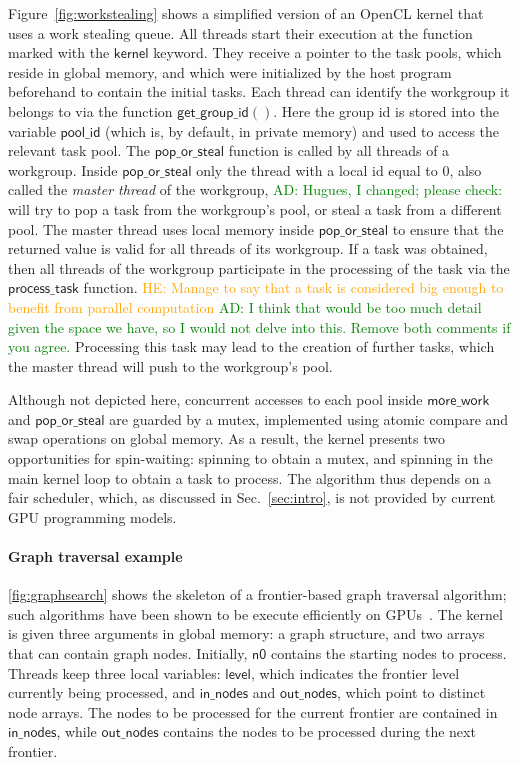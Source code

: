 \documentclass[numbers,nocopyrightspace,10pt]{sigplanconf}
\newcommand{\ADComment}[1]{\textcolor{green}{AD: #1}}
\newcommand{\HEComment}[1]{\textcolor{orange}{HE: #1}}
\newcommand{\myfiglong}{Figure~}
\newcommand{\mysec}{Sec.~}
\newcommand{\getgroupid}{\mathsf{get\_group\_id}}
\newcommand{\keyword}[1]{\mathsf{#1}}
\begin{document}
\myfiglong\ref{fig:workstealing} shows a simplified version of an OpenCL
kernel that uses a work stealing queue. All threads start their execution at the
function marked with the $\mathsf{kernel}$ keyword. They receive a
pointer to the task pools, which reside in global memory, and which
were initialized by the host program beforehand to contain the initial
tasks. Each thread can identify the workgroup it belongs to via the
function $\getgroupid()$.  Here the group id is stored into the
variable $\mathsf{pool\_id}$ (which is, by default, in private memory)
and used to access the relevant task pool. The
$\mathsf{pop\_or\_steal}$ function is called by all threads of a
workgroup.  Inside $\mathsf{pop\_or\_steal}$ only the thread with a local id equal to
$0$, also called the \emph{master thread} of the workgroup,
\ADComment{Hugues, I changed; please check:} will try to pop a task
from the workgroup's pool, or steal a task from a different pool. The
master thread uses local memory inside $\mathsf{pop\_or\_steal}$ to
ensure that the returned value is valid for all threads of its
workgroup. If a task was obtained, then all threads of the workgroup
participate in the processing of the task via the
$\mathsf{process\_task}$ function. \HEComment{Manage to say that a
  task is considered big enough to benefit from parallel computation}
\ADComment{I think that would be too much detail given the space we
  have, so I would not delve into this. Remove both comments if you
  agree.} Processing this task may lead to the creation of further
tasks, which the master thread will push to the workgroup's pool.

Although not depicted here, concurrent accesses to each pool inside
$\mathsf{more\_work}$ and $\mathsf{pop\_or\_steal}$ are guarded by a
mutex, implemented using atomic compare and swap operations on
global memory.  As a result, the kernel presents two opportunities for
spin-waiting: spinning to obtain a mutex, and spinning in the main
kernel loop to obtain a task to process.  The algorithm thus depends
on a fair scheduler, which, as discussed in \mysec\ref{sec:intro},
is not provided by current GPU programming models.

\paragraph{Graph traversal example} \mylongfig\ref{fig:graphsearch} shows the
skeleton of a frontier-based graph traversal algorithm; such algorithms have
been shown to be execute efficiently on GPUs~\cite{...}.
The kernel is
given three arguments in global memory: a graph structure, and two
arrays that can contain graph nodes. Initially, $\keyword{n0}$ contains the
starting nodes to process. Threads keep three local variables: $\keyword{level}$, which indicates the frontier level currently being
processed, and $\keyword{in\_nodes}$ and $\keyword{out\_nodes}$, which point to
distinct node arrays. The nodes to be
processed for the current frontier are contained in $\keyword{in\_nodes}$, while $\keyword{out\_nodes}$ contains
the nodes to be processed during the next frontier.
\end{document}

